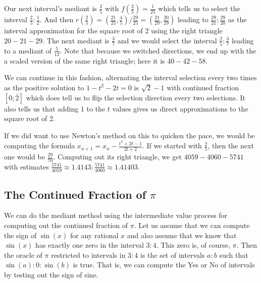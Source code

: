 \documentclass[12pt]{article}
\begin{document}
Our next interval's mediant is $\frac{2}{5}$ with $f(\frac{2}{5}) = \frac{1}{25}$ which tells us to select the interval $\frac{2}{5}:\frac{1}{2}$. And then $r(\frac{2}{5}) = (\frac{21}{25}, \frac{4}{5})/\frac{29}{25} = (\frac{21}{29}, \frac{20}{29})$ leading to $\frac{29}{21}:\frac{29}{20}$ as the interval approximation for the square root of 2 using the right triangle $20-21-29$. The next mediant is $\frac{3}{7}$ and we would select the interval $\frac{2}{5}:\frac{3}{7}$ leading to a mediant of $\frac{5}{12}$.  Note that because we switched directions, we end up with the a scaled version of the same right triangle; here it is $40-42-58$. 

We can continue in this fashion, alternating the interval selection every two times as the positive solution to $1 - t^2 - 2t = 0$ is $\sqrt{2}-1$ with continued fraction $[0;\bar{2}]$ which does tell us to flip the selection direction every two selections. It also tells us that adding $1$ to the $t$ values gives us direct approximations to the square root of 2. 

If we did want to use Newton's method on this to quicken the pace, we would be computing the formula $x_{n+1} = x_n - \frac{ t^2  + 2t -1}{2t + 2}$. If we started with $\frac{2}{5}$, then the next one would be $\frac{29}{70}$. Computing out its right triangle, we get $4059-4060-5741$ with estimates $\frac{5741}{4059}\approx 1.4143: \frac{5741}{4060} \approx 1.41403$. 

\subsection{The Continued Fraction of $\pi$}

We can do the mediant method using the intermediate value process for computing out the continued fraction of $\pi$. Let us assume that we can compute the sign of $\sin(x)$ for any rational $x$ and also assume that we know that $\sin(x)$ has exactly one zero in the interval $3:4$. This zero is, of course, $\pi$. Then the oracle of $\pi$ restricted to intervals in $3:4$ is the set of intervals $a:b$ such that $\sin(a):0:\sin(b)$ is true. That is, we can compute the Yes or No of intervals by testing out the sign of sine. 
\end{document}
